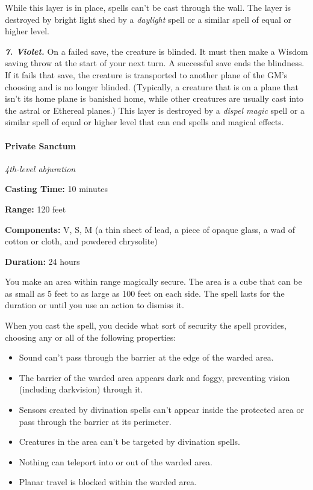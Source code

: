 \documentclass[
]{article}
\providecommand{\tightlist}{%
  \setlength{\itemsep}{0pt}\setlength{\parskip}{0pt}}
\begin{document}
While this layer is in place, spells can't be cast through the wall. The
layer is destroyed by bright light shed by a \emph{daylight} spell or a
similar spell of equal or higher level.

\emph{\textbf{7. Violet.}} On a failed save, the creature is blinded. It
must then make a Wisdom saving throw at the start of your next turn. A
successful save ends the blindness. If it fails that save, the creature
is transported to another plane of the GM's choosing and is no longer
blinded. (Typically, a creature that is on a plane that isn't its home
plane is banished home, while other creatures are usually cast into the
astral or Ethereal planes.) This layer is destroyed by a \emph{dispel
magic} spell or a similar spell of equal or higher level that can end
spells and magical effects.

\hypertarget{private-sanctum}{%
\paragraph{Private Sanctum}\label{private-sanctum}}

\emph{4th-level abjuration}

\textbf{Casting Time:} 10 minutes

\textbf{Range:} 120 feet

\textbf{Components:} V, S, M (a thin sheet of lead, a piece of opaque
glass, a wad of cotton or cloth, and powdered chrysolite)

\textbf{Duration:} 24 hours

You make an area within range magically secure. The area is a cube that
can be as small as 5 feet to as large as 100 feet on each side. The
spell lasts for the duration or until you use an action to dismiss it.

When you cast the spell, you decide what sort of security the spell
provides, choosing any or all of the following properties:

\begin{itemize}
\tightlist
\item
  Sound can't pass through the barrier at the edge of the warded area.
\item
  The barrier of the warded area appears dark and foggy, preventing
  vision (including darkvision) through it.
\item
  Sensors created by divination spells can't appear inside the protected
  area or pass through the barrier at its perimeter.
\item
  Creatures in the area can't be targeted by divination spells.
\item
  Nothing can teleport into or out of the warded area.
\item
  Planar travel is blocked within the warded area.
\end{itemize}
\end{document}

